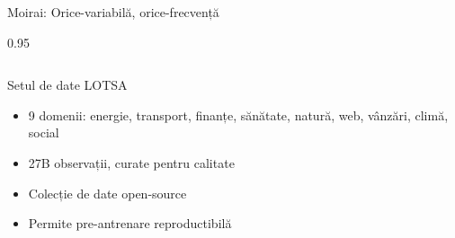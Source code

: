 \documentclass[9pt, aspectratio=169, t]{beamer}
\begin{document}
\begin{frame}{Moirai: Orice-variabilă, orice-frecvență}
\begin{cminipage}{0.95\textwidth}
{\begin{columns}[T]
        \begin{alertblock}{Setul de date LOTSA}
            \begin{itemize}\setlength{\itemsep}{0pt}
                \item 9 domenii: energie, transport, finanțe, sănătate, natură, web, vânzări, climă, social
                \item 27B observații, curate pentru calitate
                \item Colecție de date open-source
                \item Permite pre-antrenare reproductibilă
            \end{itemize}
        \end{alertblock}
    \end{columns}
    }
    \end{cminipage}
\end{frame}
\end{document}
